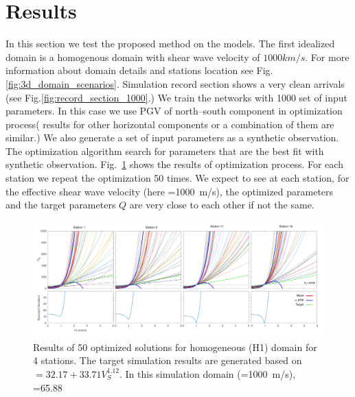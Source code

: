 \section{Results}
In this section we test the proposed method on the models. The first idealized domain is a homogenous domain with shear wave velocity of $1000 km/s$. For more information about domain details and stations location see Fig.\ref{fig:3d_domain_scenarios}. Simulation record section shows a very clean arrivals (see Fig.\ref{fig:record_section_1000}.) We train the networks with 1000 set of input parameters. In this case we use PGV of north--south component in optimization process( results for other horizontal components or a combination of them are similar.)  We also generate a set of input parameters as a synthetic observation. The optimization algorithm search for parameters that are the best fit with synthetic observation.  Fig.~\ref{fig:station_1_1000_H1} shows the results of optimization process. For each station we repeat the optimization 50 times. We expect to see at each station, for the effective shear wave velocity (here \vs{}=1000~m/s), the optimized parameters and the target parameters $Q$ are very close to each other if not the same. 

  \begin{figure}[ht]
    \centering
    \includegraphics[width=\textwidth]{figures/pdf/Figure_14-H1-pgv.pdf}
    \caption{Results of 50 optimized solutions for homogeneous (H1) domain for 4 stations. The target simulation results are generated based on \qs{}$=32.17+33.71V_{S}^{1.12}$. In this simulation domain (\vs{}=1000~m/s), \qs{}=65.88}
    \label{fig:station_1_1000_H1}
\end{figure}

